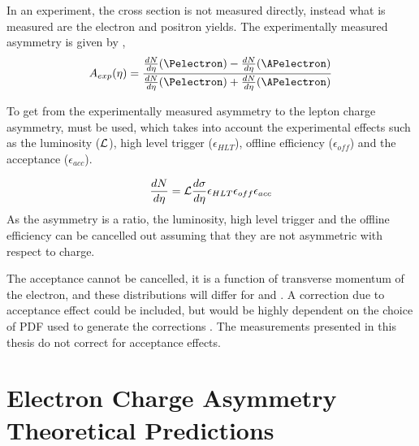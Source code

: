 In an experiment, the cross section is not measured directly, instead what is
measured are the electron and positron yields.  The experimentally measured
asymmetry is given by ,
\begin{equation}
A_{exp}(\eta)=\frac{  \frac{dN}{d\eta}(\Pelectron) -
\frac{dN}{d\eta}(\APelectron) }{ \frac{dN}{d\eta}(\Pelectron) +
\frac{dN}{d\eta}(\APelectron) }
\label{eq:AsymExp}
\end{equation} 

To get from the experimentally measured asymmetry to the lepton charge
asymmetry,  must be used, which takes into
account the experimental effects such as the luminosity (${\cal L}$), high
level trigger ($\epsilon_{HLT}$), offline efficiency ($ \epsilon_{off}$) and
the acceptance ($\epsilon_{acc}$).

\begin{equation}
\frac{dN}{d\eta} = {\cal L } \frac{d\sigma}{d\eta}  \epsilon_{HLT}
\epsilon_{off} \epsilon_{acc}
\label{eq:NumEve}
\end{equation} 
As the asymmetry is a ratio, the luminosity, high level trigger and the
offline efficiency can be cancelled out assuming that they are not asymmetric
with respect to charge. 

The acceptance cannot be cancelled, it is a function of transverse momentum of
the electron, and these distributions will differ for \Pelectron and \APelectron.
A correction due to acceptance effect could be included, but would be highly
dependent on the choice of PDF used to generate the corrections \cite{cdfWAsym}.
The measurements presented in this thesis do not correct for acceptance effects.


\section{Electron Charge Asymmetry Theoretical Predictions}
\label{sec:asymuncert}


